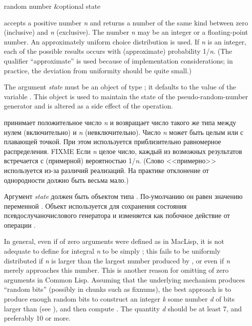 \begin{defun}[Function]
random number &optional state

 accepts a positive number \emph{n} and returns
a number of the same kind between zero (inclusive) and \emph{n} (exclusive).
The number \emph{n} may be an integer or a floating-point number.
An approximately uniform choice distribution is used.
If \emph{n} is an integer, each of the possible results
occurs with (approximate) probability 1/\emph{n}.
(The qualifier ``approximate'' is used because of implementation
considerations; in practice, the deviation from uniformity should be
quite small.)

The argument \emph{state} must be an object of type ;
it defaults to the value of the variable .
This object is used to maintain the state of the pseudo-random-number
generator and is altered as a side effect of the  operation.

 принимает положительное число \emph{n} и возвращает число
такого же типа между нулем (включительно) и \emph{n} (невключительно).
Число \emph{n} может быть целым или с плавающей точкой.
При этом используется приблизительно равномерное распределения. FIXME
Если \emph{n} целое число, каждый из возможных результатов встречается с
(примерной) вероятностью 1/\emph{n}.
(Слово <<примерно>> используется из-за различий реализаций. На практике отклонение
от однородности должно быть весьма мало.)

Аргумент \emph{state} должен быть объектом типа .
По-умолчанию он равен значению переменной .
Объект используется для сохранения состояния псевдослучаночислового генератора и
изменяется как побочное действие от операции .

\beforenoterule
\begin{implementation}
In general, even if  of zero arguments
were defined as in MacLisp,
it is not adequate to define  for integral \emph{n}
to be simply ; this fails to be uniformly distributed
if \emph{n} is larger than the largest number produced by ,
or even if \emph{n} merely approaches this number.
This is another reason for omitting  of zero arguments in Common Lisp.
Assuming that the underlying mechanism produces ``random bits''
(possibly in chunks such as fixnums), the best approach is to produce
enough random bits to construct an integer \emph{k} some number \emph{d} of bits
larger than  (see ), and
then compute .  The quantity \emph{d} should be at
least 7, and preferably 10 or more.


\end{implementation}
\end{defun}
